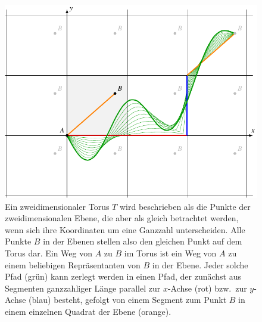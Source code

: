 %
%
%
\begin{figure}
\centering
\includegraphics{chapters/120-topologie/images/toruspfade.pdf}
\caption{Ein zweidimensionaler Torus $T$ wird beschrieben als die
Punkte der zweidimensionalen Ebene, die aber als gleich betrachtet
werden, wenn sich ihre Koordinaten um eine Ganzzahl unterscheiden.
Alle Punkte $B$ in der Ebenen stellen also den gleichen Punkt auf dem
Torus dar.
Ein Weg von $A$ zu $B$ im Torus ist ein Weg von $A$ zu einem beliebigen
Repräsentanten von $B$ in der Ebene.
Jeder solche Pfad ({\color{darkgreen}grün}) kann zerlegt werden in
einen Pfad, der zunächst aus Segmenten ganzzahliger Länge parallel
zur $x$-Achse ({\color{darkred}rot}) bzw.~zur $y$-Achse
({\color{blue}blau}) besteht, gefolgt von einem Segment zum Punkt
$B$ in einem einzelnen Quadrat der Ebene ({\color{orange}orange}).
\label{buch:topologie:kohomologie:fig:toruspfade}}
\end{figure}
